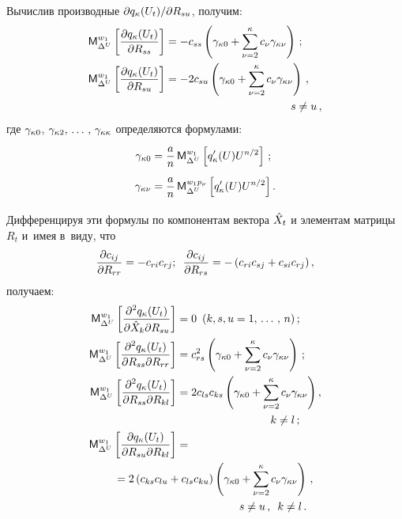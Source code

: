\begin{multicols}{2}
Вычислив производные  $\partial q_\kappa (U_t)/ \partial R_{su}$,
получим:
\begin{align*}
\mm_{\Delta^U}^{w_1 }\lk \fr{\partial q_\kkk (U_t)}{\partial R_{ss} }\rk &=
- c_{ss} \left( \gamma_{\kkk 0}
    +\sss_{\nu=2}^\kkk c_\nu \gamma_{\kkk\nu}\right)\,;%
    \\
\mm_{\Delta^U}^{w_1 }\lk \fr{\partial q_\kkk (U_t)}{\partial R_{su} }\rk&=
- 2c_{su} \left( \gamma_{\kkk 0}
    +\sss_{\nu=2}^\kkk c_\nu \gamma_{\kkk\nu}\right)\,,\\ 
    &\hspace*{40mm}    s\ne u\,,
    \end{align*}
где $\gamma_{\kappa 0}$, $\gamma_{\kappa 2},\,\ldots\,,\, \gamma_{\kappa\kappa}$
определяются формулами:
\begin{align*}
\gamma_{\kkk 0} &= \fr{a}{n}\,\mm_{\Delta^U}^{w_1 }\lk q_\kkk'(U) U^{n/2}\rk\,;%
\\
\gamma_{\kkk \nu} &= \fr{a}{n}\,\mm_{\Delta^U}^{w_1 p_\nu} \lk q_\kkk'(U) 
U^{n/2}\rk. %
\end{align*}

Дифференцируя эти формулы по компонентам вектора  ${\hat X}_t$ и
элементам матрицы $R_t$ и~имея в~виду, что
    \begin{equation}
\displaystyle\frac{\displaystyle \partial c_{ij}\mathstrut}{\displaystyle \partial R_{rr} \mathstrut} =- c_{ri} c_{rj};\enskip
\displaystyle\frac{\displaystyle \partial c_{ij}\mathstrut}{\displaystyle \partial R_{rs} \mathstrut} =- 
\left(c_{ri} c_{sj}+ c_{si} c_{rj}\right),\label{e5.19-s1}
\end{equation}
получаем:
\begin{align}
\mm_{\Delta^U}^{w_1 }\lk \fr{\partial^2 q_\kkk (U_t)}
{\partial \hx_k\partial R_{su} }\rk&=0 \enskip (k,s,u=1\tr n)\,;\label{e5.20-s1}\\
\mm_{\Delta^U}^{w_1 }\lk  \fr{\partial^2 q_\kkk (U_t)}
{\partial R_{ss}\partial R_{rr} }\rk &= c_{rs}^2
    \left( \gamma_{\kkk 0} +\sss_{\nu=2}^\kkk c_\nu \gamma_{\kkk \nu}\right)\,;
    \label{e5.21-s1}\\
\mm_{\Delta^U}^{w_1 }\lk\fr{\partial^2 q_\kkk (U_t)}
{\partial R_{ss}\partial R_{kl} }\rk&=
    2  c_{ls} c_{ks}\left( \gamma_{\kkk 0} +\sss_{\nu=2}^\kkk c_\nu 
    \gamma_{\kkk \nu}\right),\notag\\
    &\hspace*{30mm}k\ne l\,;\label{e5.22-s1}\\
\mm_{\Delta^U}^{w_1 }\lk \fr{\partial q_\kkk (U_t)}
{\partial R_{su}\partial R_{kl} }\rk &={}\notag\\
&\hspace*{-20mm}{}=
    2\left(c_{ks}c_{lu} + c_{ls} c_{ku}\right)     
    \left( \gamma_{\kkk 0} +\sss_{\nu=2}^\kkk c_\nu 
    \gamma_{\kkk \nu}\right)\,,\notag\\ 
    &\hspace*{20mm}s\ne u\,,\enskip k\ne l\,.\label{e5.23-s1}
    \end{align}


\end{multicols}
